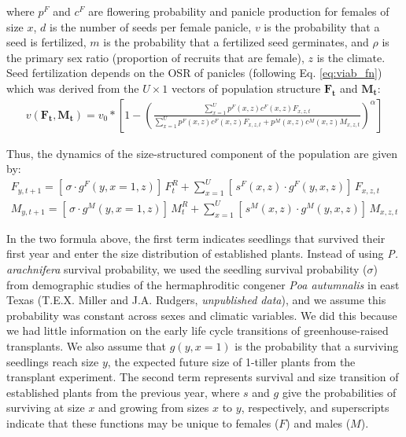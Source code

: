 \documentclass[12pt]{article}\usepackage[]{graphicx}\usepackage[dvipsnames]{xcolor}
\begin{document}
\noindent where $p^{F}$ and $c^{F}$ are flowering probability and panicle production for females of size $x$, $d$ is the number of seeds per female panicle, $v$ is the probability that a seed is fertilized, $m$ is the probability that a fertilized seed germinates, and $\rho$ is the primary sex ratio (proportion of recruits that are female), $z$ is the climate. 
Seed fertilization depends on the OSR of panicles (following Eq. \ref{eq:viab_fn}) which was derived from the $U \times 1$ vectors of population structure $\mathbf{F_{t}}$ and $\mathbf{M_{t}}$:
\begin{align}\label{eq:viab_MPM}
v(\mathbf{F_{t}},\mathbf{M_{t}}) = v_{0} * \left[ 1 - \left( \frac{\sum_{x=1}^{U} p^{F}(x,z) c^{F}(x,z) F_{x,z,t}}{\sum_{x=1}^{U} p^{F}(x,z) c^{F}(x,z) F_{x,z,t} + p^{M}(x,z) c^{M}(x,z) M_{x,z,t}} \right) ^{\alpha}\right]
\end{align}

Thus, the dynamics of the size-structured component of the population are given by:
\begin{align}\label{eq:dynamics}
F_{y,t+1} = [ \, \sigma \cdot g^{F}(y,x=1,z) ] \, F^{R}_{t} + \sum_{x=1}^{U} 	[ \, s^{F}(x,z) \cdot g^{F}(y,x,z)] \, F_{x,z,t}
\\
M_{y,t+1} = [ \, \sigma \cdot g^{M}(y,x=1,z) ] \, M^{R}_{t} + \sum_{x=1}^{U} 	[ \,  s^{M}(x,z) \cdot g^{M}(y,x,z) ] \, M_{x,z,t}
\end{align}

\noindent In the two formula above, the first term indicates seedlings that survived their first year and enter the size distribution of established plants.
Instead of using \textit{P. arachnifera} survival probability, we used the seedling survival probability ($\sigma$) from demographic studies of the hermaphroditic congener \textit{Poa autumnalis} in east Texas (T.E.X. Miller and J.A. Rudgers, \textit{unpublished data}), and we assume this probability was constant across sexes and climatic variables. 
We did this because we had little information on the early life cycle transitions of greenhouse-raised transplants.
We also assume that $g(y,x=1)$ is the probability that a surviving seedlings reach size $y$, the expected future size of 1-tiller plants from the transplant experiment.
The second term represents survival and size transition of established plants from the previous year, where $s$ and $g$ give the probabilities of surviving at size $x$ and growing from sizes $x$ to $y$, respectively, and superscripts indicate that these functions may be unique to females ($F$) and males ($M$).
\end{document}

